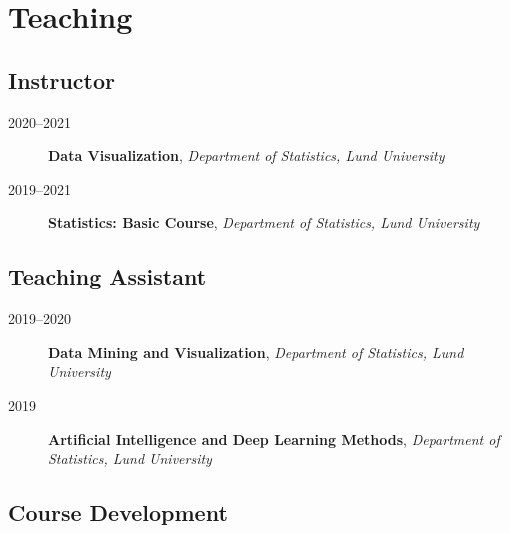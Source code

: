 \documentclass[
  10pt,
  headsepline=true,
  english,
  DIV=12
]{scrartcl}
\renewcommand*{%
  \mkbibnamegiven
}[1]{\ifitemannotation{highlight}{\textbf{#1}}{#1}}
\renewcommand*{%
  \mkbibnamefamily
}[1]{\ifitemannotation{highlight}{\textbf{#1}}{#1}}
\begin{document}
\section{Teaching}

\subsection{Instructor}

\begin{description}
  \item[2020--2021]{
        \textbf{Data Visualization}, \emph{Department of Statistics, Lund
          University}
        }
  \item[2019--2021]{
        \textbf{Statistics: Basic Course}, \emph{Department of Statistics, Lund
          University}

        }
\end{description}

\subsection{Teaching Assistant}

\begin{description}

  \item[2019--2020]{
        \textbf{Data Mining and Visualization}, \emph{Department of Statistics,
          Lund University}

        }

  \item[2019]{
        \textbf{Artificial Intelligence and Deep Learning Methods},
        \emph{Department of Statistics, Lund University}

        }

\end{description}

\subsection{Course Development}
\end{document}
